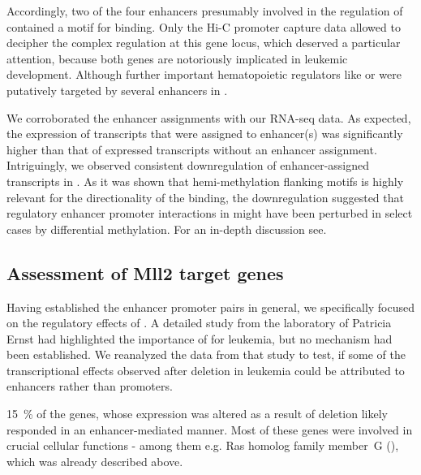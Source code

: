 Accordingly, two of the four enhancers presumably involved in the regulation of  contained a motif for  binding. Only the Hi-C promoter capture data allowed to decipher the complex regulation at this gene locus, which deserved a particular attention, because both genes are notoriously implicated in leukemic development\cite{Tybulewicz2005,Jackson2015,Wang2013,Nimmagadda2018}\cite{Nakamura1996,Borrow1996,Zutven2006,Wang2007a,Wang2009,Franks2017}.  Although further important hematopoietic regulators like  or  were putatively targeted by several enhancers in \mllafnine. 

We corroborated the enhancer assignments with our RNA-seq data. As expected, the expression of transcripts that were assigned to enhancer(s) was significantly higher than that of expressed transcripts without an enhancer assignment\supplefig. Intriguingly, we observed consistent downregulation of enhancer-assigned transcripts in \dnmtchip \supplefig. As it was shown that hemi-methylation flanking  motifs is highly relevant for the directionality of the binding\cite{Xu2018b},  the downregulation suggested that regulatory enhancer promoter interactions in \dnmtchip might have been perturbed in select cases by differential methylation. For an in-depth discussion see. 
\FloatBarrier \clearpage
\subsection{Assessment of Mll2 target genes}
\label{chap:r:enhancers:targets:mlltwotargets}

\fyfrank

Having established the enhancer promoter pairs in general, we specifically focused on the regulatory effects of .  A detailed study from the laboratory of Patricia Ernst had highlighted the importance of  for \mllafnine leukemia\cite{Chen2017a}, but no mechanism had been established. We reanalyzed the data from that study to test, if some of the transcriptional effects observed after  deletion in \mllafnine leukemia could be attributed to enhancers rather than promoters.
 	
\SI{15}{\percent} of the genes, whose expression was altered as a result of  deletion likely responded in an enhancer-mediated manner. Most of these genes were involved in crucial cellular functions - among them e.g. Ras homolog family member~G (), which was already described above. 

